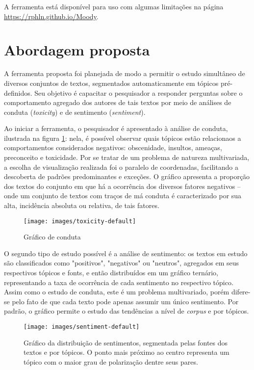 A ferramenta está disponível para uso com algumas limitações na página \url{https://rphln.github.io/Moody}.

\section{Abordagem proposta}

A ferramenta proposta foi planejada de modo a permitir o estudo simultâneo de diversos conjuntos de textos, segmentados automaticamente em tópicos pré-definidos. Seu objetivo é capacitar o pesquisador a responder perguntas sobre o comportamento agregado dos autores de tais textos por meio de análises de conduta (\textit{toxicity}) e de sentimento (\textit{sentiment}).

Ao iniciar a ferramenta, o pesquisador é apresentado à análise de conduta, ilustrada na figura \ref{fig:toxicity-default}: nela, é possível observar quais tópicos estão relacionaos a comportamentos considerados negativos: obscenidade, insultos, ameaças, preconceito e toxicidade. Por se tratar de um problema de natureza multivariada, a escolha de visualização realizada foi o paralelo de coordenadas, facilitando a descoberta de padrões predominantes e exceções. O gráfico apresenta a proporção dos textos do conjunto em que há a ocorrência dos diversos fatores negativos -- onde um conjunto de textos com traços de má conduta é caracterizado por sua alta, incidência absoluta ou relativa, de tais fatores.

\begin{figure}[hbtp]
    \centering
    \texttt{[image: images/toxicity-default]}
    \caption{Gráfico de conduta}
    \label{fig:toxicity-default}
\end{figure}

O segundo tipo de estudo possível é a análise de sentimento: os textos em estudo são classificados como "positivos", "negativos" ou "neutros", agregados em seus respectivos tópicos e fonts, e então distribuídos em um gráfico ternário, representando a taxa de ocorrência de cada sentimento no respectivo tópico. Assim como o estudo de conduta, este é um problema multivariado, porém difere-se pelo fato de que cada texto pode apenas assumir um único sentimento. Por padrão, o gráfico permite o estudo das tendências a nível de \emph{corpus} e por tópicos.

\begin{figure}[hbtp]
    \centering
    \texttt{[image: images/sentiment-default]}
    \caption{Gráfico da distribuição de sentimentos, segmentada pelas fontes dos textos e por tópicos. O ponto mais próximo ao centro representa um tópico com o maior grau de polarização dentre seus pares.}
    \label{fig:sentiment-default}
\end{figure}

